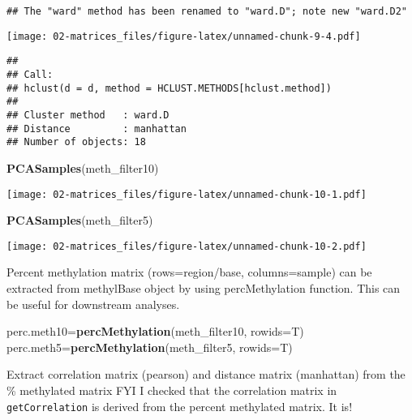 \documentclass[]{article}
\newenvironment{Shaded}{\begin{snugshade}}{\end{snugshade}}
\newcommand{\KeywordTok}[1]{\textcolor[rgb]{0.13,0.29,0.53}{\textbf{#1}}}
\newcommand{\DataTypeTok}[1]{\textcolor[rgb]{0.13,0.29,0.53}{#1}}
\newcommand{\NormalTok}[1]{#1}
\begin{document}
\begin{verbatim}
## The "ward" method has been renamed to "ward.D"; note new "ward.D2"
\end{verbatim}

\texttt{[image: 02-matrices\_files/figure-latex/unnamed-chunk-9-4.pdf]}

\begin{verbatim}
## 
## Call:
## hclust(d = d, method = HCLUST.METHODS[hclust.method])
## 
## Cluster method   : ward.D 
## Distance         : manhattan 
## Number of objects: 18
\end{verbatim}

\begin{Shaded}
\begin{Highlighting}[]
\KeywordTok{PCASamples}\NormalTok{(meth_filter10)}
\end{Highlighting}
\end{Shaded}

\texttt{[image: 02-matrices\_files/figure-latex/unnamed-chunk-10-1.pdf]}

\begin{Shaded}
\begin{Highlighting}[]
\KeywordTok{PCASamples}\NormalTok{(meth_filter5)}
\end{Highlighting}
\end{Shaded}

\texttt{[image: 02-matrices\_files/figure-latex/unnamed-chunk-10-2.pdf]}

Percent methylation matrix (rows=region/base, columns=sample) can be
extracted from methylBase object by using percMethylation function. This
can be useful for downstream analyses.

\begin{Shaded}
\begin{Highlighting}[]
\NormalTok{perc.meth10=}\KeywordTok{percMethylation}\NormalTok{(meth_filter10, }\DataTypeTok{rowids=}\NormalTok{T)}
\NormalTok{perc.meth5=}\KeywordTok{percMethylation}\NormalTok{(meth_filter5, }\DataTypeTok{rowids=}\NormalTok{T)}
\end{Highlighting}
\end{Shaded}

Extract correlation matrix (pearson) and distance matrix (manhattan)
from the \% methylated matrix FYI I checked that the correlation matrix
in \texttt{getCorrelation} is derived from the percent methylated
matrix. It is!
\end{document}
